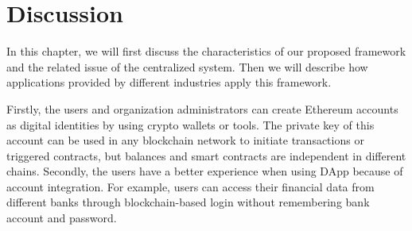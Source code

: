\chapter{Discussion}
\label{chapter:discussion}

In this chapter, we will first discuss the characteristics of our proposed framework and the related issue of the centralized system. Then we will describe how applications provided by different industries apply this framework.
\par
Firstly, the users and organization administrators can create Ethereum accounts as digital identities by using crypto wallets or tools. The private key of this account can be used in any blockchain network to initiate transactions or triggered contracts, but balances and smart contracts are independent in different chains.   Secondly, the users have a better experience when using DApp because of account integration. For example, users can access their financial data from different banks through blockchain-based login without remembering bank account and password.

